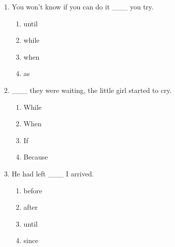 \documentclass[11pt,a4paper]{ctexart}
\begin{document}
\begin{enumerate}[leftmargin=*,itemsep=4pt]
\begin{enumerate}[label=\Alph*.,leftmargin=2em,itemsep=1pt,topsep=2pt]
\item although
\item unless
\end{enumerate}
\item You won’t know if you can do it \_\_\_ you try.
\begin{enumerate}[label=\Alph*.,leftmargin=2em,itemsep=1pt,topsep=2pt]
\item until
\item while
\item when
\item as
\end{enumerate}
\item \_\_\_ they were waiting, the little girl started to cry.
\begin{enumerate}[label=\Alph*.,leftmargin=2em,itemsep=1pt,topsep=2pt]
\item While
\item When
\item If
\item Because
\end{enumerate}
\item He had left \_\_\_ I arrived.
\begin{enumerate}[label=\Alph*.,leftmargin=2em,itemsep=1pt,topsep=2pt]
\item before
\item after
\item until
\item since
\end{enumerate}
\end{enumerate}
\end{document}
